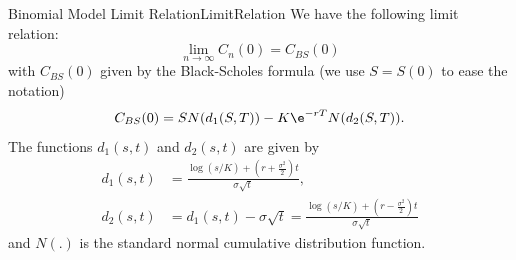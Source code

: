 \begin{prop}{Binomial Model Limit Relation}{LimitRelation}
	We have the following limit relation:
	\[
		\lim_{n\to\infty} C_n(0) = C_{BS}(0)
	\]
	with $C_{BS}(0)$ given by the Black-Scholes formula (we use $S = S(0)$ to ease the notation)
	\begin{equation}
		C_{BS}(0) = S N(d_1(S,T)) - K \e^{-rT} N(d_2(S,T)). \label{eq:BlackScholesFormula}
	\end{equation}
	The functions $d_1(s,t)$ and $d_2(s,t)$ are given by
	\begin{align*}
		d_1(s,t) & = \frac{\log(s/K) + (r + \frac{\sigma^2}{2})t}{\sigma\sqrt{t}},                            \\
		d_2(s,t) & = d_1(s,t) - \sigma\sqrt{t} = \frac{\log(s/K) + (r - \frac{\sigma^2}{2})t}{\sigma\sqrt{t}}
	\end{align*}
	and $N(.)$ is the standard normal cumulative distribution function.
\end{prop}

